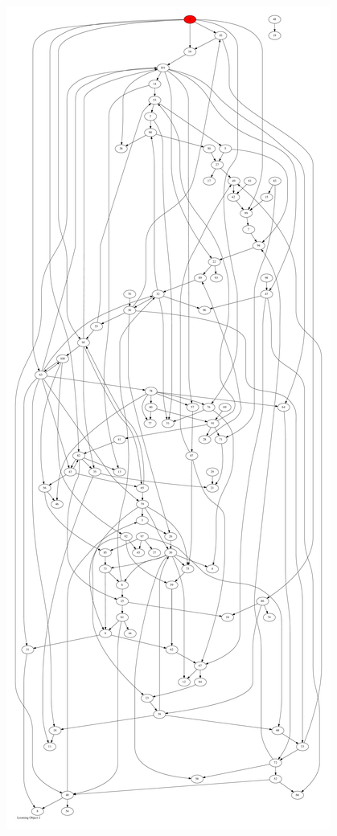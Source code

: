 \documentclass{article}
\begin{document}
\newpage
\includegraphics[max height=\textheight,max width=\textwidth]{looming_object/loom_obj2_pp.pdf}
\end{document}
